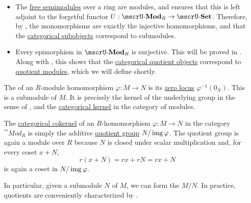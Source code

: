 \begin{definition}
\begin{thmenum}
\begin{itemize}
      \item The \hyperref[def:free_semimodule]{free semimodules} over a ring are modules, and  ensures that this is left adjoint to the forgetful functor \( U: \ucat{Mod}_R \to \ucat{Set} \). Therefore, by , the monomorphisms are exactly the injective homomorphisms, and that the \hyperref[def:subobject_and_quotient]{categorical subobjects} correspond to submodules.

      \item Every epimorphism in \( \ucat{Mod}_R \) is surjective. This will be proved in . Along with , this shows that the \hyperref[def:subobject_and_quotient]{categorical quotient objects} correspond to \hyperref[def:module/quotient]{quotient modules}, which we will define shortly.
    \end{itemize}

     The  of an \( R \)-module homomorphism \( \varphi: M \to N \) is its \hyperref[def:zero_locus]{zero locus} \( \varphi^{-1}(0_N) \). This is a submodule of \( M \). It is precisely the kernel of the underlying group in the sense of , and the \hyperref[def:zero_morphisms/cokernel]{categorical kernel} in the category of modules.

     The \hyperref[def:zero_morphisms/cokernel]{categorical cokernel} of an \( R \)-homomorphism \( \varphi: M \to N \) in the category \( \cat{Mod}_R \) is simply the additive \hyperref[def:group/quotient]{quotient group} \( N / \operatorname{img} \varphi \). The quotient group is again a module over \( R \) because \( N \) is closed under scalar multiplication and, for every coset \( x + N \),
    \begin{equation*}
      r(x + N) = rx + rN = rx + N
    \end{equation*}
    is again a coset in \( N / \operatorname{img} \varphi \).

    In particular, given a submodule \( N \) of \( M \), we can form the  \( M / N \). In practice, quotients are conveniently characterized by .
  \end{thmenum}
\end{definition}


